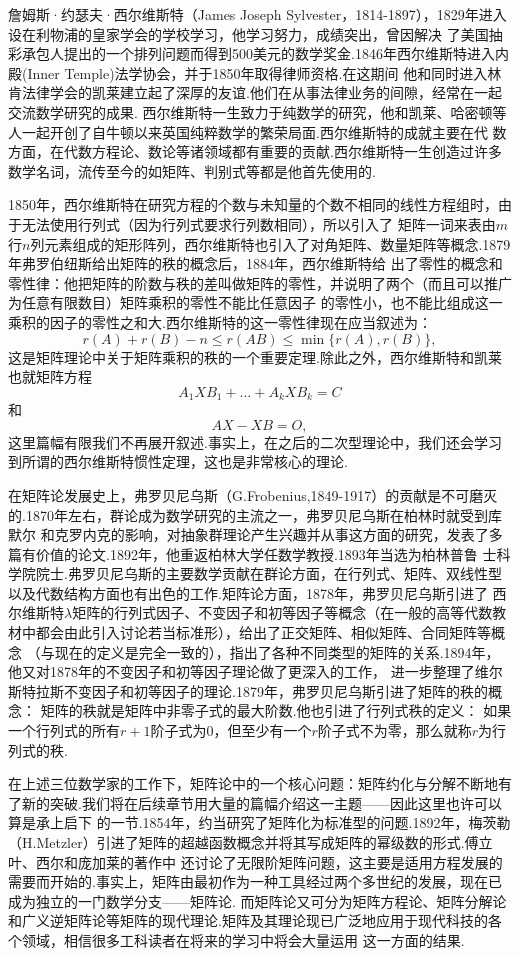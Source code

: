 詹姆斯·约瑟夫·西尔维斯特（James Joseph Sylvester，1814-1897），1829年进入设在利物浦的皇家学会的学校学习，他学习努力，成绩突出，曾因解决
了美国抽彩承包人提出的一个排列问题而得到500美元的数学奖金.1846年西尔维斯特进入内殿(Inner Temple)法学协会，并于1850年取得律师资格.在这期间
他和同时进入林肯法律学会的凯莱建立起了深厚的友谊.他们在从事法律业务的间隙，经常在一起交流数学研究的成果.
西尔维斯特一生致力于纯数学的研究，他和凯莱、哈密顿等人一起开创了自牛顿以来英国纯粹数学的繁荣局面.西尔维斯特的成就主要在代
数方面，在代数方程论、数论等诸领域都有重要的贡献.西尔维斯特一生创造过许多数学名词，流传至今的如矩阵、判别式等都是他首先使用的.

1850年，西尔维斯特在研究方程的个数与未知量的个数不相同的线性方程组时，由于无法使用行列式（因为行列式要求行列数相同），所以引入了
矩阵一词来表由$m$行$n$列元素组成的矩形阵列，西尔维斯特也引入了对角矩阵、数量矩阵等概念.1879年弗罗伯纽斯给出矩阵的秩的概念后，1884年，西尔维斯特给
出了零性的概念和零性律：他把矩阵的阶数与秩的差叫做矩阵的零性，并说明了两个（而且可以推广为任意有限数目）矩阵乘积的零性不能比任意因子
的零性小，也不能比组成这一乘积的因子的零性之和大.西尔维斯特的这一零性律现在应当叙述为：
\[r(A)+r(B)-n\leqslant r(AB)\leqslant\min\{r(A),r(B)\},\]
这是矩阵理论中关于矩阵乘积的秩的一个重要定理.除此之外，西尔维斯特和凯莱也就矩阵方程
\[A_1XB_1+\ldots+A_kXB_k=C\]
和
\[AX-XB=O,\]
这里篇幅有限我们不再展开叙述.事实上，在之后的二次型理论中，我们还会学习到所谓的西尔维斯特惯性定理，这也是非常核心的理论.

在矩阵论发展史上，弗罗贝尼乌斯（G.Frobenius,1849-1917）的贡献是不可磨灭的.1870年左右，群论成为数学研究的主流之一，弗罗贝尼乌斯在柏林时就受到库默尔
和克罗内克的影响，对抽象群理论产生兴趣并从事这方面的研究，发表了多篇有价值的论文.1892年，他重返柏林大学任数学教授.1893年当选为柏林普鲁
士科学院院士.弗罗贝尼乌斯的主要数学贡献在群论方面，在行列式、矩阵、双线性型以及代数结构方面也有出色的工作.矩阵论方面，1878年，弗罗贝尼乌斯引进了
西尔维斯特$\lambda$矩阵的行列式因子、不变因子和初等因子等概念（在一般的高等代数教材中都会由此引入讨论若当标准形），给出了正交矩阵、相似矩阵、合同矩阵等概念
（与现在的定义是完全一致的），指出了各种不同类型的矩阵的关系.1894年，他又对1878年的不变因子和初等因子理论做了更深入的工作，
进一步整理了维尔斯特拉斯不变因子和初等因子的理论.1879年，弗罗贝尼乌斯引进了矩阵的秩的概念： 矩阵的秩就是矩阵中非零子式的最大阶数.他也引进了行列式秩的定义：
如果一个行列式的所有$r+1$阶子式为0，但至少有一个$r$阶子式不为零，那么就称$r$为行列式的秩.

在上述三位数学家的工作下，矩阵论中的一个核心问题：矩阵约化与分解不断地有了新的突破.我们将在后续章节用大量的篇幅介绍这一主题——因此这里也许可以算是承上启下
的一节.1854年，约当研究了矩阵化为标准型的问题.1892年，梅茨勒（H.Metzler）引进了矩阵的超越函数概念并将其写成矩阵的幂级数的形式.傅立叶、西尔和庞加莱的著作中
还讨论了无限阶矩阵问题，这主要是适用方程发展的需要而开始的.事实上，矩阵由最初作为一种工具经过两个多世纪的发展，现在已成为独立的一门数学分支——矩阵论.
而矩阵论又可分为矩阵方程论、矩阵分解论和广义逆矩阵论等矩阵的现代理论.矩阵及其理论现已广泛地应用于现代科技的各个领域，相信很多工科读者在将来的学习中将会大量运用
这一方面的结果.



